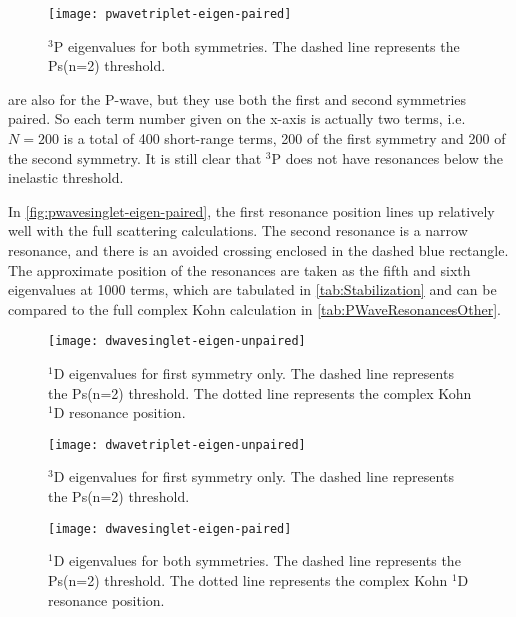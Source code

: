 \documentclass[Dissertation.tex]{subfiles}
\begin{document}
\begin{figure}[H]
	\centering
	\texttt{[image: pwavetriplet-eigen-paired]}
	\caption[$^3$P eigenvalues for both symmetries]{$^3$P eigenvalues for both symmetries. The dashed line represents the Ps(n=2) threshold.}
	\label{fig:pwavetriplet-eigen-paired}
\end{figure}

 are also for the P-wave, but they use both the first and second symmetries paired. So each term number given on the x-axis is actually two terms, i.e. $N = 200$ is a total of 400 short-range terms, 200 of the first symmetry and 200 of the second symmetry. It is still clear that $^3$P does not have resonances below the inelastic threshold.

In \cref{fig:pwavesinglet-eigen-paired}, the first resonance position lines up relatively well with the full scattering calculations. The second resonance is a narrow resonance, and there is an avoided crossing enclosed in the dashed blue rectangle. The approximate position of the resonances are taken as the fifth and sixth eigenvalues at 1000 terms, which are tabulated in \cref{tab:Stabilization} and can be compared to the full complex Kohn calculation in \cref{tab:PWaveResonancesOther}.

\begin{figure}[H]
	\centering
	\texttt{[image: dwavesinglet-eigen-unpaired]}
	\caption[$^1$D eigenvalues for first symmetry only]{$^1$D eigenvalues for first symmetry only. The dashed line represents the Ps(n=2) threshold. The dotted line represents the complex Kohn $^1$D resonance position.}
	\label{fig:dwavesinglet-eigen-unpaired}
\end{figure}

\begin{figure}[H]
	\centering
	\texttt{[image: dwavetriplet-eigen-unpaired]}
	\caption[$^3$D eigenvalues for first symmetry only]{$^3$D eigenvalues for first symmetry only. The dashed line represents the Ps(n=2) threshold.}
	\label{fig:dwavetriplet-eigen-unpaired}
\end{figure}

\begin{figure}[H]
	\centering
	\texttt{[image: dwavesinglet-eigen-paired]}
	\caption[$^1$D eigenvalues for both symmetries]{$^1$D eigenvalues for both symmetries. The dashed line represents the Ps(n=2) threshold. The dotted line represents the complex Kohn $^1$D resonance position.}
	\label{fig:dwavesinglet-eigen-paired}
\end{figure}
\end{document}
